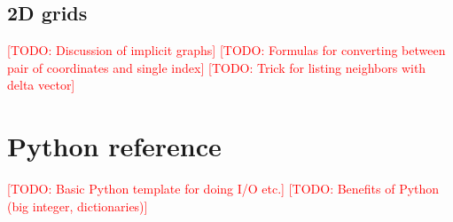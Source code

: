 \documentclass[10pt]{book}
\newcommand{\todo}[1]{\textcolor{red}{[TODO: #1]}}
\begin{document}
\section{2D grids}

\todo{Discussion of implicit graphs}
\todo{Formulas for converting between pair of coordinates and single index}
\todo{Trick for listing neighbors with delta vector}

\chapter{Python reference}

\todo{Basic Python template for doing I/O etc.}
\todo{Benefits of Python (big integer, dictionaries)}
\end{document}
